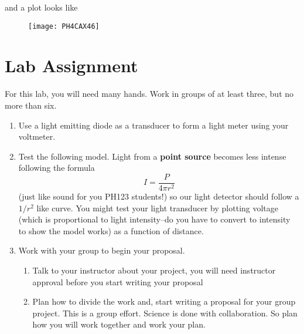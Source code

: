 and a plot looks like\begin{figure}[h!]
\texttt{[image: PH4CAX46]}
\end{figure}

\vspace*{\fill}%
\pagebreak

\section{Lab Assignment}

For this lab, you will need many hands. Work in groups of at least three,
but no more than six.

\begin{enumerate}
\item Use a light emitting diode as a transducer to form a light meter using
your voltmeter.

\item Test the following model. Light from a \textbf{point source} becomes
less intense following the formula%
\begin{equation*}
I=\frac{P}{4\pi r^{2}}
\end{equation*}%
(just like sound for you PH123 students!) so our light detector should
follow a $1/r^{2}$ like curve. You might test your light transducer by
plotting voltage (which is proportional to light intensity--do you have to
convert to intensity to show the model works) as a function of distance.

\item Work with your group to begin your proposal.

\begin{enumerate}
\item Talk to your instructor about your project, you will need instructor
approval before you start writing your proposal

\item Plan how to divide the work and, start writing a proposal for your
group project. This is a group effort. Science is done with collaboration.
So plan how you will work together and work your plan.
\end{enumerate}
\end{enumerate}

\vfill%
